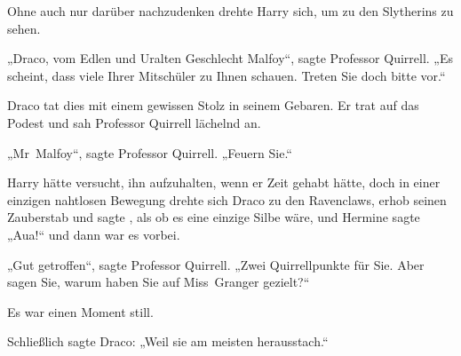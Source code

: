 Ohne auch nur darüber nachzudenken drehte Harry sich, um zu den Slytherins zu sehen.

„Draco, vom Edlen und Uralten Geschlecht Malfoy“, sagte Professor Quirrell. „Es scheint, dass viele Ihrer Mitschüler zu Ihnen schauen. Treten Sie doch bitte vor.“

Draco tat dies mit einem gewissen Stolz in seinem Gebaren. Er trat auf das Podest und sah Professor Quirrell lächelnd an.

„Mr~Malfoy“, sagte Professor Quirrell. „Feuern Sie.“

Harry hätte versucht, ihn aufzuhalten, wenn er Zeit gehabt hätte, doch in einer einzigen nahtlosen Bewegung drehte sich Draco zu den Ravenclaws, erhob seinen Zauberstab und sagte , als ob es eine einzige Silbe wäre, und Hermine sagte „Aua!“ und dann war es vorbei.

„Gut getroffen“, sagte Professor Quirrell. „Zwei Quirrellpunkte für Sie. Aber sagen Sie, warum haben Sie auf Miss~Granger gezielt?“

Es war einen Moment still.

Schließlich sagte Draco: „Weil sie am meisten herausstach.“


